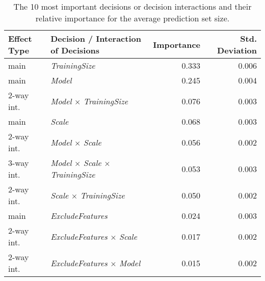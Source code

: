 \begin{table}
\centering
\caption{The 10 most important decisions or decision interactions and their relative importance for the average prediction set size.}
\label{tab:fanova_top10}
\begin{tabular}{llrr}
\toprule
Effect Type &                                   Decision / Interaction of Decisions &  Importance &  Std. Deviation \\
\midrule
       main &                                                 \textit{TrainingSize} &       0.333 &           0.006 \\
       main &                                                        \textit{Model} &       0.245 &           0.004 \\
 2-way int. &                         \textit{Model} $\times$ \textit{TrainingSize} &       0.076 &           0.003 \\
       main &                                                        \textit{Scale} &       0.068 &           0.003 \\
 2-way int. &                                \textit{Model} $\times$ \textit{Scale} &       0.056 &           0.002 \\
 3-way int. & \textit{Model} $\times$ \textit{Scale} $\times$ \textit{TrainingSize} &       0.053 &           0.003 \\
 2-way int. &                         \textit{Scale} $\times$ \textit{TrainingSize} &       0.050 &           0.002 \\
       main &                                              \textit{ExcludeFeatures} &       0.024 &           0.003 \\
 2-way int. &                      \textit{ExcludeFeatures} $\times$ \textit{Scale} &       0.017 &           0.002 \\
 2-way int. &                      \textit{ExcludeFeatures} $\times$ \textit{Model} &       0.015 &           0.002 \\
\bottomrule
\end{tabular}
\end{table}
